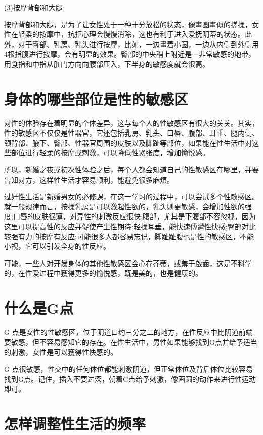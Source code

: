 \documentclass[12pt,UTF8]{ctexbook}
\begin{document}
(3)按摩背部和大腿

按摩背部和大腿，是为了让女性处于一种十分放松的状态，像畫圆畫似的搓揉，女性在轻柔的按摩中，抗拒心理会慢慢消除，这也有利于进入爱抚阴蒂的状态。此外，对于臀部、乳房、乳头进行按摩，比如，一边畫着小圆，一边从内侧到外侧用4根指腹进行按摩，会有明显的效果。臀部的中央稍上附近是一非常敏感的地带，用食指和中指从肛门方向向腰部压入，下半身的敏感度就会很高。

\section{身体的哪些部位是性的敏感区}

对性的体验存在着明显的个体差异，这与每个人的性敏感区有很大的关关。其实，性的敏感区不仅仅是性器官，它还包括乳房、乳头、口唇、腹部、耳垂、腿内侧、颈背部、腋下、臀部、性器官周围的皮肤以及脚趾等部位，如果能在性生活中对这些部位进行轻柔的按摩或刺激，可以降低性紧张度，增加愉悦感。

所以，新婚之夜或初次性体验之后，每个人都会知道自己的性敏感区在哪里，并要告知对方，这样性生活才容易顺利，能避免很多麻煩。

过好性生活是新婚男女的必修課，在这一学习的过程中，可以尝试多个性敏感区。就一般规律而言，按揉乳房是可以激起性欲的，乳头则更敏感，会增加性欲的强度;口唇的皮肤很薄，对异性的刺激反应很快;腹部，尤其是下腹部不容忽视，因为这里可以提高性的反应并促使产生性期待;轻揉耳垂，能快速傅遞性快感;臀部对比较强有力的按摩有反应;可能很多人都容易忘记，脚趾趾腹也是性的敏感区，不能小视，它可以引发全身的性反应。

可能，一些人对开发身体的其他性敏感区会心存芥蒂，或羞于啟齒，这是不科学的，在性爱过程中獲得更多的愉悦感，既是美的，也是健康的。

\section{什么是G点}

G 点是女性的性敏感区，位于阴道口约三分之二的地方，在性反应中比阴道前端要敏感，但不容易感知它的存在。在性生活中，男性如果能够找到G点并给予适当的刺激，女性是可以獲得性快感的。

G 点很敏感，性交中的任何体位都能刺激阴道，但正常体位及背后体位比较容易找到G点。记住，插入不要过深，朝着G点给予刺激，像画圆的动作来进行性运动即可。

\section{怎样调整性生活的频率}
\end{document}
